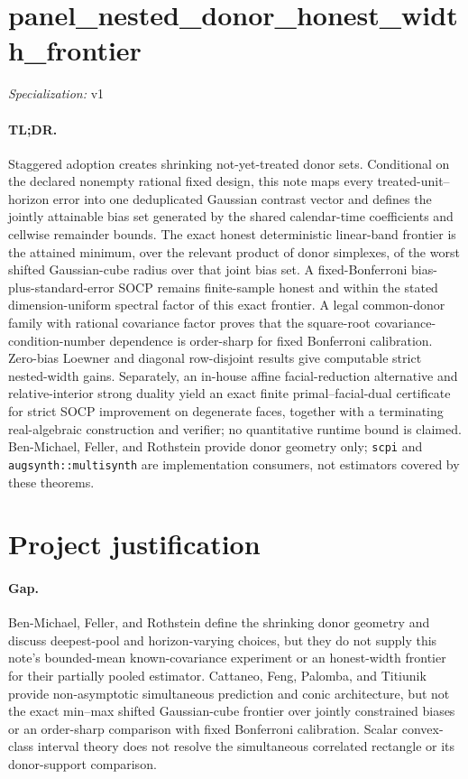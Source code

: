 \documentclass{article}
\begin{document}
\sloppy

\section*{panel\_\allowbreak{}nested\_\allowbreak{}donor\_\allowbreak{}honest\_\allowbreak{}width\_\allowbreak{}frontier}

\noindent\textit{Specialization:} v1\par

\paragraph{TL;DR.} Staggered adoption creates shrinking not-yet-treated donor sets. Conditional on the declared nonempty rational fixed design, this note maps every treated-unit--horizon error into one deduplicated Gaussian contrast vector and defines the jointly attainable bias set generated by the shared calendar-time coefficients and cellwise remainder bounds. The exact honest deterministic linear-band frontier is the attained minimum, over the relevant product of donor simplexes, of the worst shifted Gaussian-cube radius over that joint bias set. A fixed-Bonferroni bias-plus-standard-error SOCP remains finite-sample honest and within the stated dimension-uniform spectral factor of this exact frontier. A legal common-donor family with rational covariance factor proves that the square-root covariance-condition-number dependence is order-sharp for fixed Bonferroni calibration. Zero-bias Loewner and diagonal row-disjoint results give computable strict nested-width gains. Separately, an in-house affine facial-reduction alternative and relative-interior strong duality yield an exact finite primal--facial-dual certificate for strict SOCP improvement on degenerate faces, together with a terminating real-algebraic construction and verifier; no quantitative runtime bound is claimed. Ben-Michael, Feller, and Rothstein provide donor geometry only; \texttt{scpi} and \texttt{augsynth::multisynth} are implementation consumers, not estimators covered by these theorems.

\section{Project justification}

\paragraph{Gap.} Ben-Michael, Feller, and Rothstein define the shrinking donor geometry and discuss deepest-pool and horizon-varying choices, but they do not supply this note's bounded-mean known-covariance experiment or an honest-width frontier for their partially pooled estimator. Cattaneo, Feng, Palomba, and Titiunik provide non-asymptotic simultaneous prediction and conic architecture, but not the exact min--max shifted Gaussian-cube frontier over jointly constrained biases or an order-sharp comparison with fixed Bonferroni calibration. Scalar convex-class interval theory does not resolve the simultaneous correlated rectangle or its donor-support comparison.
\end{document}
